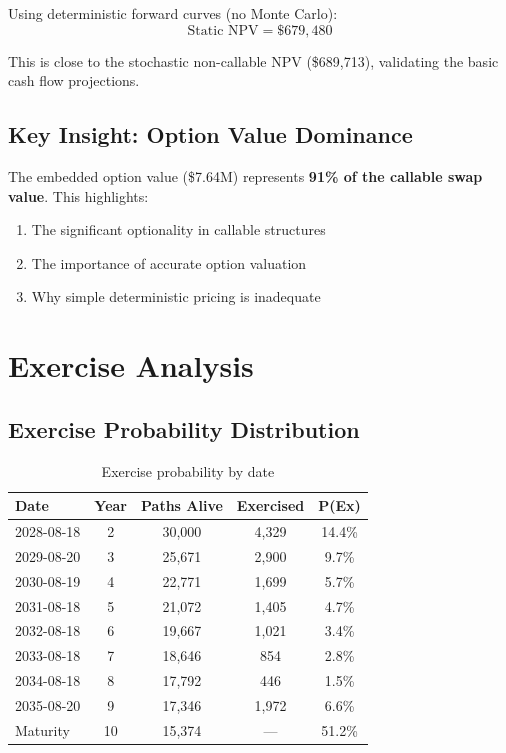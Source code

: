 \documentclass[10pt,a4paper]{article}
\begin{document}
Using deterministic forward curves (no Monte Carlo):
\[
\text{Static NPV} = \$679,480
\]

This is close to the stochastic non-callable NPV (\$689,713), validating the basic cash flow projections.

\subsection{Key Insight: Option Value Dominance}

The embedded option value (\$7.64M) represents \textbf{91\% of the callable swap value}. This highlights:

\begin{enumerate}
    \item The significant optionality in callable structures
    \item The importance of accurate option valuation
    \item Why simple deterministic pricing is inadequate
\end{enumerate}

\newpage

\section{Exercise Analysis}

\subsection{Exercise Probability Distribution}

\begin{table}[H]
\centering
\begin{tabular}{lcccc}
\toprule
\textbf{Date} & \textbf{Year} & \textbf{Paths Alive} & \textbf{Exercised} & \textbf{P(Ex)} \\
\midrule
2028-08-18 & 2 & 30,000 & 4,329 & 14.4\% \\
2029-08-20 & 3 & 25,671 & 2,900 & 9.7\% \\
2030-08-19 & 4 & 22,771 & 1,699 & 5.7\% \\
2031-08-18 & 5 & 21,072 & 1,405 & 4.7\% \\
2032-08-18 & 6 & 19,667 & 1,021 & 3.4\% \\
2033-08-18 & 7 & 18,646 & 854 & 2.8\% \\
2034-08-18 & 8 & 17,792 & 446 & 1.5\% \\
2035-08-20 & 9 & 17,346 & 1,972 & 6.6\% \\
\midrule
Maturity & 10 & 15,374 & --- & 51.2\% \\
\bottomrule
\end{tabular}
\caption{Exercise probability by date}
\end{table}
\end{document}
